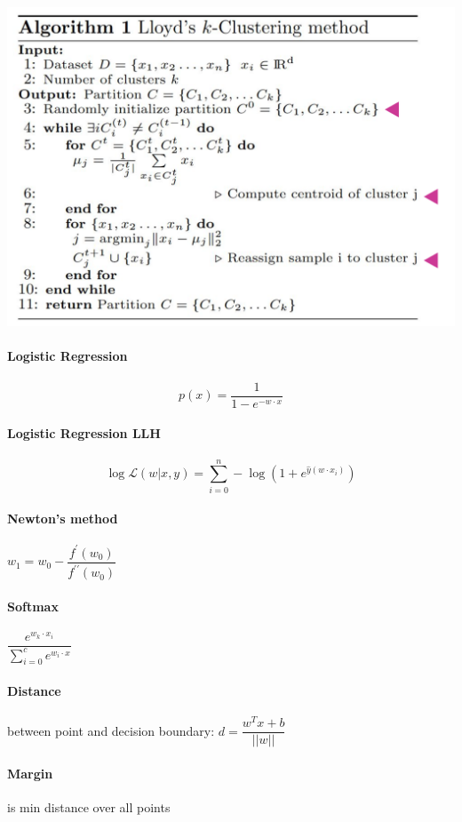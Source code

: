 \documentclass[11pt]{article}
\begin{document}
\includegraphics[width=400pt]{one.png}

\paragraph{Logistic Regression}

$$p(x) = \dfrac{1}{1 - e^{-w \cdot x}}$$

\paragraph{Logistic Regression LLH}

$$\log \mathcal{L} (w | x, y) = \sum_{i=0}^n - \log \left(1 + e^{\hat{y} (w \cdot x_i)}\right) $$

\paragraph{Newton's method} $w_1 = w_0 - \dfrac{f^\prime(w_0)}{f^{\prime\prime}(w_0)}$

\paragraph{Softmax} $\dfrac{e^{w_k \cdot x_i}}{\sum_{i=0}^c e^{w_i \cdot x}}$

\paragraph{Distance} between point and decision boundary: $d = \dfrac{w^T x + b}{||w||}$

\paragraph{Margin} is min distance over all points
\end{document}
